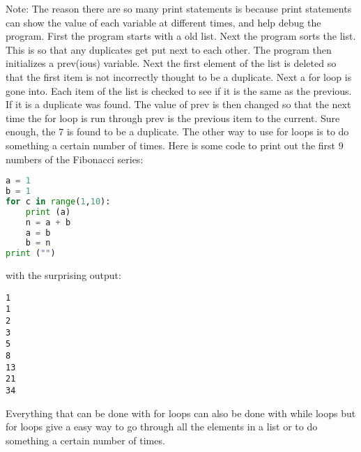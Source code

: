 Note: The reason there are so many print statements is because print statements
can show the value of each variable at different times, and help debug the
program. First the program starts with a old list. Next the program sorts the
list. This is so that any duplicates get put next to each other. The program
then initializes a prev(ious) variable. Next the first element of the list is
deleted so that the first item is not incorrectly thought to be a duplicate.
Next a for loop is gone into. Each item of the list is checked to see if it is
the same as the previous. If it is a duplicate was found. The value of prev is
then changed so that the next time the for loop is run through prev is the
previous item to the current. Sure enough, the 7 is found to be a duplicate.
The other way to use for loops is to do something a certain number of times.
Here is some code to print out the first 9 numbers of the Fibonacci series:
\lstset{basicstyle=\scriptsize, numbers=left, captionpos=b, tabsize=4}
\begin{lstlisting}[caption=Fibonacci For Loop,language={Python},
xleftmargin=15pt, label=lst:fibonacciforloop]
a = 1
b = 1
for c in range(1,10):
    print (a)
    n = a + b
    a = b
    b = n
print ("")
\end{lstlisting}

with the surprising output:
\scriptsize
\begin{verbatim}
1
1
2
3
5
8
13
21
34
\end{verbatim}
\normalsize

Everything that can be done with for loops can also be done with while loops but
for loops give a easy way to go through all the elements in a list or to do
something a certain number of times.
